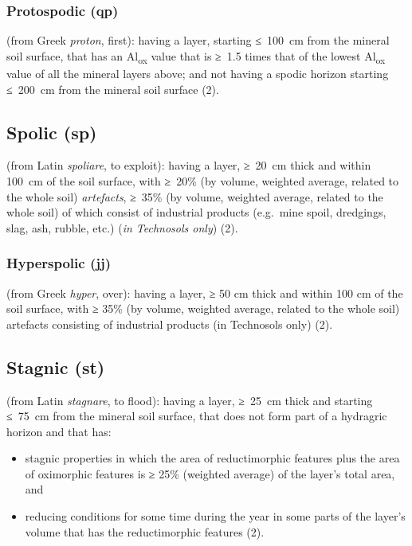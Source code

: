 \documentclass[
  letterpaper,
  DIV=11,
  numbers=noendperiod]{scrreprt}
\providecommand{\tightlist}{%
  \setlength{\itemsep}{0pt}\setlength{\parskip}{0pt}}\usepackage{longtable,booktabs,array}
\begin{document}
\hypertarget{protospodic-qp-1}{%
\subsubsection{Protospodic (qp)}\label{protospodic-qp-1}}

(from Greek \emph{proton}, first): having a layer, starting ≤~100~cm
from the mineral soil surface, that has an Al\textsubscript{ox} value
that is ≥~1.5 times that of the lowest Al\textsubscript{ox} value of all
the mineral layers above; and not having a spodic horizon starting
≤~200~cm from the mineral soil surface (2).

\hypertarget{spolic-sp}{%
\subsection{Spolic (sp)}\label{spolic-sp}}

(from Latin \emph{spoliare}, to exploit): having a layer, ≥~20~cm thick
and within 100~cm of the soil surface, with ≥~20\% (by volume, weighted
average, related to the whole soil) \emph{artefacts}, ≥~35\% (by volume,
weighted average, related to the whole soil) of which consist of
industrial products (e.g.~mine spoil, dredgings, slag, ash, rubble,
etc.) (\emph{in Technosols only}) (2).

\hypertarget{hyperspolic-jj}{%
\subsubsection{Hyperspolic (jj)}\label{hyperspolic-jj}}

(from Greek \emph{hyper}, over): having a layer, ≥ 50 cm thick and
within 100 cm of the soil surface, with ≥ 35\% (by volume, weighted
average, related to the whole soil) artefacts consisting of industrial
products (in Technosols only) (2).

\hypertarget{stagnic-st}{%
\subsection{Stagnic (st)}\label{stagnic-st}}

(from Latin \emph{stagnare}, to flood): having a layer, ≥~25~cm thick
and starting ≤~75~cm from the mineral soil surface, that does not form
part of a hydragric horizon and that has:

\begin{itemize}
\tightlist
\item
  stagnic properties in which the area of reductimorphic features plus
  the area of oximorphic features is ≥ 25\% (weighted average) of the
  layer's total area, and
\item
  reducing conditions for some time during the year in some parts of the
  layer's volume that has the reductimorphic features (2).
\end{itemize}
\end{document}
